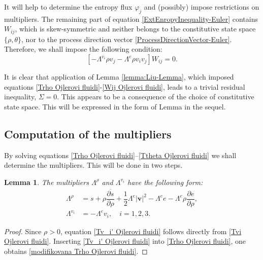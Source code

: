 \documentclass[a4paper,fleqn]{cas-sc}
\newtheorem{lemma}{Lemma}[section]
\theoremstyle{definition}
\begin{document}
It will help to determine the entropy flux $\varphi_{j}$ and (possibly) impose restrictions on multipliers. The remaining part of equation \eqref{ExtEnropyInequality-Euler} contains $W_{ij}$, which is skew-symmetric and neither belongs to the constitutive state space $\{ \rho, \theta \}$, nor to the process direction vector \eqref{ProcessDirectionVector-Euler}. Therefore, we shall impose the following condition: 
\begin{equation} \label{Wij Ojlerovi fluidi}
	\left[ -\Lambda^{v_i}\rho v_j-\Lambda^{e}\rho v_i v_j \right] W_{ij} = 0. 
\end{equation}

It is clear that application of Lemma \ref{lemma:Liu-Lemma}, which imposed equations \eqref{Trho Ojlerovi fluidi}-\eqref{Wij Ojlerovi fluidi}, leads to a trivial residual inequality, $\Sigma = 0$. This appears to be a consequence of the choice of constitutive state space. This will be expressed in the form of Lemma in the sequel. 

\subsection{Computation of the multipliers} 

By solving equations \eqref{Trho Ojlerovi fluidi}--\eqref{Ttheta Ojlerovi fluidi} we shall determine the multipliers. This will be done in two steps. 
\begin{lemma} \label{Lema:Lambda1-Ojler}
	The multipliers $\Lambda^{\rho}$ and $\Lambda^{v_i}$ have the following form: 
	\begin{align}
		\label{modifikovana Trho Ojlerovi fluidi}
		\Lambda^\rho & = s + \rho\overline{\dfrac{\partial s}{\partial\rho}} 
		+ \dfrac{1}{2}\Lambda^e|\mathbf{v}|^2 - \Lambda^ e e 
		- \Lambda^e \rho \dfrac{\partial e}{\partial\rho}, 
		\\
		\label{Tv_i' Ojlerovi fluidi}
		\Lambda^{v_i} & = -\Lambda^e v_i, \quad i = 1, 2, 3.
	\end{align}
\end{lemma}

\begin{proof}
	Since $\rho > 0$, equation \eqref{Tv_i' Ojlerovi fluidi} follows directly from \eqref{Tvi Ojlerovi fluidi}. Inserting \eqref{Tv_i' Ojlerovi fluidi} into \eqref{Trho Ojlerovi fluidi}, one obtains \eqref{modifikovana Trho Ojlerovi fluidi}. 
\end{proof}
\end{document}

